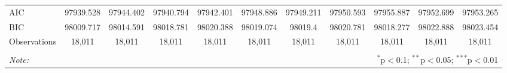 \begin{table}[!htbp]
\begin{tabular}{@{\extracolsep{5pt}}lcccccccccc}
AIC & 97939.528 & 97944.402 & 97940.794 & 97942.401 & 97948.886 & 97949.211 & 97950.593 & 97955.887 & 97952.699 & 97953.265 \\ 
BIC & 98009.717 & 98014.591 & 98018.781 & 98020.388 & 98019.074 & 98019.4 & 98020.781 & 98018.277 & 98022.888 & 98023.454 \\ 
Observations & 18,011 & 18,011 & 18,011 & 18,011 & 18,011 & 18,011 & 18,011 & 18,011 & 18,011 & 18,011 \\ 
\hline 
\hline \\[-1.8ex] 
\textit{Note:}  & \multicolumn{10}{r}{$^{*}$p$<$0.1; $^{**}$p$<$0.05; $^{***}$p$<$0.01} \\ 
\end{tabular} 
\end{table} 
